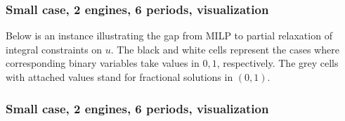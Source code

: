 
\begin{frame}
  \frametitle{Small case, 2 engines, 6 periods, visualization}
  Below is an instance illustrating the gap from MILP to partial relaxation of integral constraints on \(u\).
  The black and white cells represent the cases where corresponding binary variables take values in \(0, 1\), respectively.
  The grey cells with attached values stand for fractional solutions in \((0, 1)\).

\end{frame}
\begin{frame}
  \frametitle{Small case, 2 engines, 6 periods, visualization}

  \begin{figure}
  \end{figure}
\end{frame}
